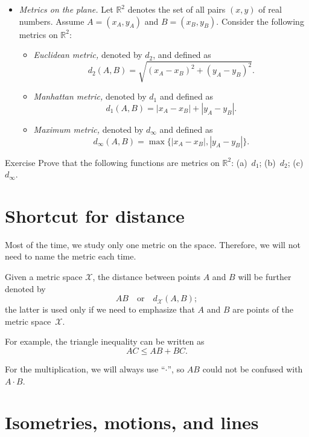\begin{itemize}
\item {}\emph{Metrics on the plane.}
Let $\mathbb{R}^2$ denotes the set of all pairs $(x,y)$ of real numbers.
Assume $A=(x_A,y_A)$ and $B=(x_B,y_B)$.
Consider the following metrics on $\mathbb{R}^2$:
\begin{itemize}
\item{}\emph{Euclidean metric,} denoted by $d_2$, and defined as \label{def:d_2}
$$d_2(A,B)=\sqrt{(x_A-x_B)^2+(y_A-y_B)^2}.$$
\item\label{Manhattan plane}\emph{Manhattan metric,} denoted by $d_1$ and defined as 
$$d_1(A,B)=|x_A-x_B|+|y_A-y_B|.$$
\item{}\emph{Maximum metric,} denoted by $d_\infty$ and defined as 
$$d_\infty(A,B)=\max\{|x_A-x_B|,|y_A-y_B|\}.$$
\end{itemize}
\end{itemize}

\begin{thm}{Exercise}\label{ex:d_1+d_2+d_infty}
Prove that the following functions are metrics on $\mathbb{R}^2$:
(a)~$d_1$; (b)~$d_2$; (c)~$d_\infty$.
\end{thm}


\section*{Shortcut for distance}

Most of the time, 
we study only one metric on the space.
Therefore, we will not need to name the metric each time.

Given a metric space $\mathcal X$,
the distance between points $A$ and $B$ will be further denoted by 
$$AB
\quad
\text{or}
\quad
d_{\mathcal X}(A,B);$$
the latter is used only if we need to emphasize that $A$ and $B$ are points of the metric space~$\mathcal X$.

For example, the triangle inequality can be written as 
$$AC\le AB+BC.$$

For the multiplication, we will always use ``$\cdot$'',
so $AB$ could not be confused with $A\cdot B$.

\section*{Isometries, motions, and lines}

